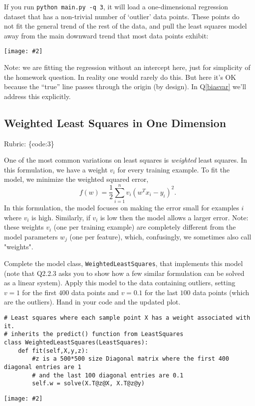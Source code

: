 \documentclass{article}
\def\rubric#1{\gre{Rubric: \{#1\}}}{}
\def\blu#1{{\color{blu}#1}}
\def\gre#1{{\color{gre}#1}}
\newcommand{\centerfig}[2]{\begin{center}\texttt{[image: \#2]}\end{center}}
\begin{document}
If you run \verb|python main.py -q 3|, it will load a one-dimensional regression
dataset that has a non-trivial number of `outlier' data points.
These points do not fit the general trend of the rest of the data,
and pull the least squares model away from the main downward trend that most data points exhibit:
\centerfig{.7}{./figs/least_squares_outliers.pdf}

Note: we are fitting the regression without an intercept here, just for simplicity of the homework question.
In reality one would rarely do this. But here it's OK because the ``true'' line
passes through the origin (by design). In Q\ref{biasvar} we'll address this explicitly.

\subsection{Weighted Least Squares in One Dimension}
\rubric{code:3}

One of the most common variations on least squares is \emph{weighted} least squares. In this formulation, we have a weight $v_i$ for every training example. To fit the model, we minimize the weighted squared error,
\[
f(w) =  \frac{1}{2}\sum_{i=1}^n v_i(w^Tx_i - y_i)^2.
\]
In this formulation, the model focuses on making the error small for examples $i$ where $v_i$ is high. Similarly, if $v_i$ is low then the model allows a larger error. Note: these weights $v_i$ (one per training example) are completely different from the model parameters $w_j$ (one per feature), which, confusingly, we sometimes also call "weights".

Complete the model class, \texttt{WeightedLeastSquares}, that implements this model
(note that Q2.2.3 asks you to show how a few similar formulation can be solved as a linear system).
Apply this model to the data containing outliers, setting $v = 1$ for the first
$400$ data points and $v = 0.1$ for the last $100$ data points (which are the outliers).
\blu{Hand in your code and the updated plot}.
\begin{lstlisting}
# Least squares where each sample point X has a weight associated with it.
# inherits the predict() function from LeastSquares
class WeightedLeastSquares(LeastSquares):
    def fit(self,X,y,z):
        #z is a 500*500 size Diagonal matrix where the first 400 diagonal entries are 1
        # and the last 100 diagonal entries are 0.1
        self.w = solve(X.T@z@X, X.T@z@y)
\end{lstlisting}
\centerfig{.7}{./figs/Weighted_least_squares_outliers.pdf}
\end{document}
